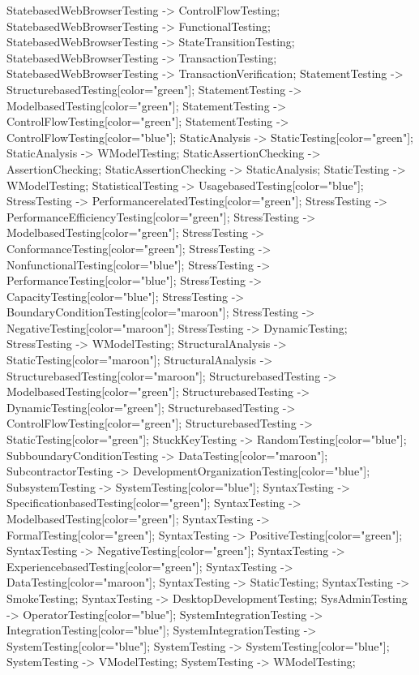 \documentclass{article}
\begin{document}
{StatebasedWebBrowserTesting -> ControlFlowTesting;
StatebasedWebBrowserTesting -> FunctionalTesting;
StatebasedWebBrowserTesting -> StateTransitionTesting;
StatebasedWebBrowserTesting -> TransactionTesting;
StatebasedWebBrowserTesting -> TransactionVerification;
StatementTesting -> StructurebasedTesting[color="green"];
StatementTesting -> ModelbasedTesting[color="green"];
StatementTesting -> ControlFlowTesting[color="green"];
StatementTesting -> ControlFlowTesting[color="blue"];
StaticAnalysis -> StaticTesting[color="green"];
StaticAnalysis -> WModelTesting;
StaticAssertionChecking -> AssertionChecking;
StaticAssertionChecking -> StaticAnalysis;
StaticTesting -> WModelTesting;
StatisticalTesting -> UsagebasedTesting[color="blue"];
StressTesting -> PerformancerelatedTesting[color="green"];
StressTesting -> PerformanceEfficiencyTesting[color="green"];
StressTesting -> ModelbasedTesting[color="green"];
StressTesting -> ConformanceTesting[color="green"];
StressTesting -> NonfunctionalTesting[color="blue"];
StressTesting -> PerformanceTesting[color="blue"];
StressTesting -> CapacityTesting[color="blue"];
StressTesting -> BoundaryConditionTesting[color="maroon"];
StressTesting -> NegativeTesting[color="maroon"];
StressTesting -> DynamicTesting;
StressTesting -> WModelTesting;
StructuralAnalysis -> StaticTesting[color="maroon"];
StructuralAnalysis -> StructurebasedTesting[color="maroon"];
StructurebasedTesting -> ModelbasedTesting[color="green"];
StructurebasedTesting -> DynamicTesting[color="green"];
StructurebasedTesting -> ControlFlowTesting[color="green"];
StructurebasedTesting -> StaticTesting[color="green"];
StuckKeyTesting -> RandomTesting[color="blue"];
SubboundaryConditionTesting -> DataTesting[color="maroon"];
SubcontractorTesting -> DevelopmentOrganizationTesting[color="blue"];
SubsystemTesting -> SystemTesting[color="blue"];
SyntaxTesting -> SpecificationbasedTesting[color="green"];
SyntaxTesting -> ModelbasedTesting[color="green"];
SyntaxTesting -> FormalTesting[color="green"];
SyntaxTesting -> PositiveTesting[color="green"];
SyntaxTesting -> NegativeTesting[color="green"];
SyntaxTesting -> ExperiencebasedTesting[color="green"];
SyntaxTesting -> DataTesting[color="maroon"];
SyntaxTesting -> StaticTesting;
SyntaxTesting -> SmokeTesting;
SyntaxTesting -> DesktopDevelopmentTesting;
SysAdminTesting -> OperatorTesting[color="blue"];
SystemIntegrationTesting -> IntegrationTesting[color="blue"];
SystemIntegrationTesting -> SystemTesting[color="blue"];
SystemTesting -> SystemTesting[color="blue"];
SystemTesting -> VModelTesting;
SystemTesting -> WModelTesting;
}
\end{document}
